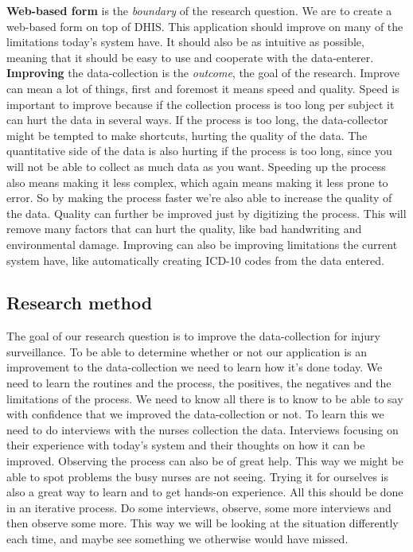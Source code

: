 \documentclass[UKenglish, 12pt]{article}
\newcommand{\is}{injury surveillance}
\begin{document}
\textbf{Web-based form} is the \textit{boundary} of the research question. We are to
create a web-based form on top of DHIS. This application should improve on many
of the limitations today's system have. It should also be as intuitive as
possible, meaning that it should be easy to use and cooperate with the
data-enterer.\\

\textbf{Improving} the data-collection is the \textit{outcome}, the goal of the
research. Improve can mean a lot of things, first and foremost it means speed
and quality. Speed is important to improve because if the collection process is
too long per subject it can hurt the data in several ways. If the process is too
long, the data-collector might be tempted to make shortcuts, hurting the quality
of the data. The quantitative side of the data is also hurting if the process
is too long, since you will not be able to collect as much data as you want.
Speeding up the process also means making it less complex, which again means
making it less prone to error. So by making the process faster we're also able
to increase the quality of the data.  Quality can further be improved just by
digitizing the process. This will remove many factors that can hurt the quality,
like bad handwriting and environmental damage.
Improving can also be improving limitations the current system have, like
automatically creating ICD-10 codes from the data entered.\\

\subsection*{Research method} 
The goal of our research question is to improve the data-collection for \is. To
be able to determine whether or not our application is an improvement to the
data-collection we need to learn how it's done today. We need to learn the
routines and the process, the positives, the negatives and the limitations of
the process. We need to know all there is to know to be able to say with
confidence that we improved the data-collection or not. To learn this we need to do
interviews with the nurses collection the data. Interviews focusing on their
experience with today's system and their thoughts on how it can be improved.
Observing the process can also be of great help. This way we might be able to
spot problems the busy nurses are not seeing.
Trying it for ourselves is also a great way to learn and to get hands-on
experience. All this should be done in an iterative process. Do some interviews,
observe, some more interviews and then observe some more. This way we will be
looking at the situation differently each time, and maybe see something we
otherwise would have missed.\\
\end{document}
